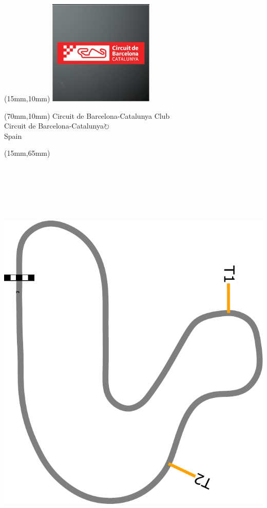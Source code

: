 \null\newpage
\begin{textblock*}{50mm}(15mm,10mm)%
\includegraphics[width=50mm]{LG/2015-05-20_00078.png}
\end{textblock*}
\begin{textblock*}{130mm}(70mm,10mm)%
{\fontsize{20}{20}\selectfont Circuit de Barcelona-Catalunya Club\\}
{\fontsize{16}{16}\selectfont Circuit de Barcelona-Catalunya\hfill \Large$\circlearrowright$\\}
{\fontsize{12}{12}\selectfont Spain\\}
\end{textblock*}
\begin{textblock*}{185mm}(15mm,65mm)%
\centering
\mbox{\includegraphics[width=185mm,height=210mm,keepaspectratio]{PT/CBACCL.pdf}}
\end{textblock*}
